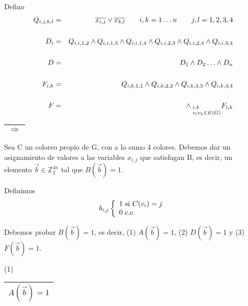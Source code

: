 \documentclass[12pt,a4paper]{report}
\begin{document}
		Defino
		\begin{eqnarray}
			Q_{i, j, k, l} &=& \overline{x_{i, j}} \vee \overline{x_{k, l}}  \qquad i, k = 1 \dotsc n \qquad j, l = 1, 2, 3, 4 \\ 
			\nonumber \\
			D_{i} &=& Q_{i, i, 1, 2} \wedge Q_{i, i, 1, 3} \wedge Q_{i, i, 1, 4} \wedge Q_{i, i, 2, 3} \wedge Q_{i, i, 2, 4} \wedge Q_{i, i, 3, 4} \\
			\nonumber \\
			D &=& D_{1} \wedge D_{2} \dotsc \wedge D_{n} \\
			\nonumber \\
			F_{i, k} &=& Q_{i, k, 1, 1} \wedge Q_{i, k, 2, 2} \wedge Q_{i, k, 3, 3} \wedge Q_{i, k, 4, 4} \\
			\nonumber \\
			F &=& \wedge_{\begin{subarray}{l} \; i, k \\ \; v_{i} v_{k} \in E(G) \end{subarray}} F_{i, k}
		\end{eqnarray}
		
		\begin{tabular}{|c|} \hline $\Rightarrow$ \\ \hline \end{tabular}
		\vspace{3mm}
		
		Sea C un coloreo propio de G, con a lo sumo 4 colores. Debemos dar un asignamiento de valores a las variables $x_{i, j}$ que satisfagan B, es decir, un elemento $\overrightarrow{b} \in \mathbb{Z}^{4n}_{2}$ tal que $B(\overrightarrow{b}) = 1$.
		
		\vspace{5mm}
		Definimos
		\begin{equation*}
			b_{i, j}
  			\left \lbrace
  			\begin{array}{l}
    		 1 \textup{ si } C(v_{i}) = j \\
     		 0 \; c.c \\
  			\end{array}
  			\right.
		\end{equation*}
		
		Debemos probar $B(\overrightarrow{b}) = 1$, es decir, (1) $A(\overrightarrow{b}) = 1$, (2) $D(\overrightarrow{b}) = 1$ y (3) $F(\overrightarrow{b}) = 1$.
		
		\vspace{3mm}
		(1) \begin{tabular}{|c|} \hline $A(\overrightarrow{b}) = 1$ \\ \hline \end{tabular}
		
\end{document}
